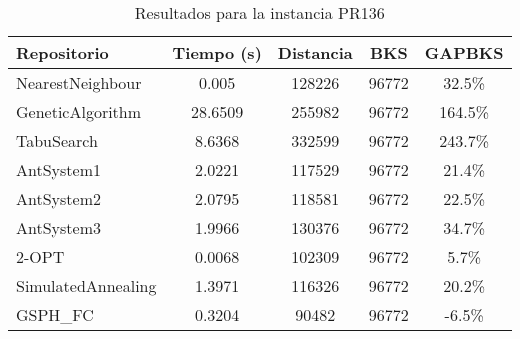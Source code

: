 \begin{table}[H]
\centering
\caption{Resultados para la instancia PR136}
\begin{tabular}{|l|c|c|c|c|}
\hline
\textbf{Repositorio} & \textbf{Tiempo (s)} & \textbf{Distancia} & \textbf{BKS} & \textbf{GAPBKS} \\ 
\hline
NearestNeighbour & 0.005 & 128226 & 96772 & 32.5\% \\ 
GeneticAlgorithm & 28.6509 & 255982 & 96772 & 164.5\% \\ 
TabuSearch & 8.6368 & 332599 & 96772 & 243.7\% \\ 
AntSystem1 & 2.0221 & 117529 & 96772 & 21.4\% \\ 
AntSystem2 & 2.0795 & 118581 & 96772 & 22.5\% \\ 
AntSystem3 & 1.9966 & 130376 & 96772 & 34.7\% \\ 
2-OPT & 0.0068 & 102309 & 96772 & 5.7\% \\ 
SimulatedAnnealing & 1.3971 & 116326 & 96772 & 20.2\% \\ 
GSPH_FC & 0.3204 & 90482 & 96772 & -6.5\% \\ 
\hline
\end{tabular}
\end{table}
